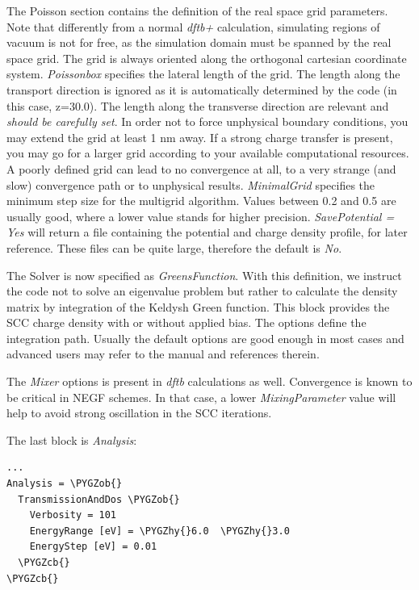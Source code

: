 \documentclass[a4paper,11pt,english]{sphinxmanual}
\def\PYGZob{\char`\{}
\def\PYGZcb{\char`\}}
\def\PYGZhy{\char`\-}
\begin{document}
{{The Poisson section contains the definition of the real space grid
parameters. Note that differently from a normal \emph{dftb+} calculation,
simulating regions of vacuum is not for free, as the simulation domain
must be spanned by the real space grid. The grid is always oriented
along the orthogonal cartesian coordinate system. \emph{Poissonbox}
specifies the lateral length of the grid. The length along the
transport direction is ignored as it is automatically determined by
the code (in this case, z=30.0). The length along the transverse
direction are relevant and \emph{should be carefully set}. In order not to
force unphysical boundary conditions, you may extend the grid at least
1 nm away. If a strong charge transfer is present, you may go for a
larger grid according to your available computational resources. A
poorly defined grid can lead to no convergence at all, to a very
strange (and slow) convergence path or to unphysical
results. \emph{MinimalGrid} specifies the minimum step size for the
multigrid algorithm. Values between 0.2 and 0.5 are usually good,
where a lower value stands for higher precision. \emph{SavePotential = Yes}
will return a file containing the potential and charge density
profile, for later reference. These files can be quite large,
therefore the default is \emph{No}.

The Solver is now specified as \emph{GreensFunction}. With this
definition, we instruct the code not to solve an eigenvalue problem
but rather to calculate the density matrix by integration of the
Keldysh Green function. This block provides the SCC charge density
with or without applied bias. The options define the integration
path. Usually the default options are good enough in most cases and
advanced users may refer to the manual and references therein.

The \emph{Mixer} options is present in \emph{dftb} calculations as
well. Convergence is known to be critical in NEGF schemes. In that
case, a lower \emph{MixingParameter} value will help to avoid strong
oscillation in the SCC iterations.

The last block is \emph{Analysis}:

\begin{Verbatim}[commandchars=\\\{\}]
...
Analysis = \PYGZob{}
  TransmissionAndDos \PYGZob{}
    Verbosity = 101
    EnergyRange [eV] = \PYGZhy{}6.0  \PYGZhy{}3.0
    EnergyStep [eV] = 0.01
  \PYGZcb{}
\PYGZcb{}
\end{Verbatim}

}}
\end{document}
